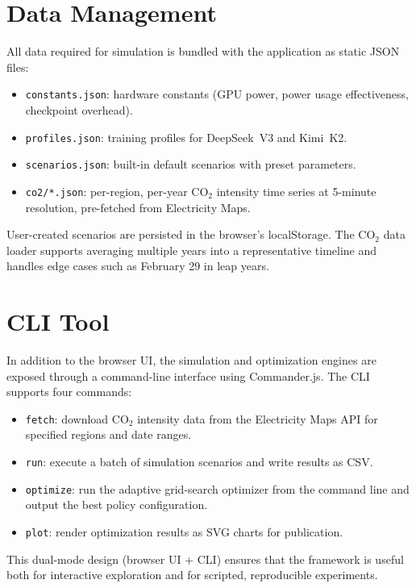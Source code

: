 \section{Data Management}
\label{sec:data-management}

All data required for simulation is bundled with the application as static
JSON files:
\begin{itemize}
  \item \texttt{constants.json}: hardware constants (GPU power, power usage effectiveness,
    checkpoint overhead).
  \item \texttt{profiles.json}: training profiles for DeepSeek~V3 and
    Kimi~K2.
  \item \texttt{scenarios.json}: built-in default scenarios with preset
    parameters.
  \item \texttt{co2/*.json}: per-region, per-year CO$_2$ intensity time series
    at 5-minute resolution, pre-fetched from Electricity Maps.
\end{itemize}

User-created scenarios are persisted in the browser's localStorage.  The CO$_2$
data loader supports averaging multiple years into a representative timeline
and handles edge cases such as February 29 in leap years.

\section{CLI Tool}
\label{sec:cli}

In addition to the browser UI, the simulation and optimization engines are
exposed through a command-line interface using Commander.js.  The CLI supports
four commands:
\begin{itemize}
  \item \texttt{fetch}: download CO$_2$ intensity data from the Electricity
    Maps API for specified regions and date ranges.
  \item \texttt{run}: execute a batch of simulation scenarios and write
    results as CSV.
  \item \texttt{optimize}: run the adaptive grid-search optimizer from the
    command line and output the best policy configuration.
  \item \texttt{plot}: render optimization results as SVG charts for
    publication.
\end{itemize}

This dual-mode design (browser UI + CLI) ensures that the framework is useful
both for interactive exploration and for scripted, reproducible experiments.

